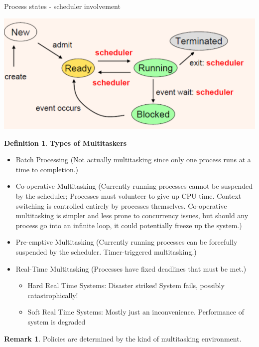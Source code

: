 \documentclass[12pt,a4paper]{article}
\theoremstyle{definition}
\newtheorem*{remark}{Remark}
\newtheorem{definition}{Definition}[section]
\newenvironment{myitemize}
{ \begin{itemize}
    \setlength{\itemsep}{5pt}
    \setlength{\parskip}{0pt}
    \setlength{\parsep}{0pt}     }
{ \end{itemize}                  }
\begin{document}
\begin{tcolorbox}
	\textsf{Process states - scheduler involvement}
	
	\includegraphics[scale=0.4]{m1/processSchedulerStates}
	\centering
\end{tcolorbox}

\begin{definition}{\textbf{Types of Multitaskers}}
	\begin{myitemize}
		\item Batch Processing (Not actually multitasking since only one process runs at a time to completion.)
		\item Co-operative Multitasking (Currently running processes cannot be suspended by the scheduler; Processes must volunteer to give up CPU time. Context switching is controlled entirely by processes themselves. Co-operative multitasking is simpler and less prone to concurrency issues, but should any process go into an infinite loop, it could potentially freeze up the system.)
		\item Pre-emptive Multitasking (Currently running processes can be forcefully suspended by the scheduler. \textsf{Timer-triggered} multitasking.)
		\item Real-Time Multitasking (Processes have fixed deadlines that must be met.)
		\begin{myitemize}
			\item Hard Real Time Systems: Disaster strikes! System fails, possibly catastrophically!
			\item Soft Real Time Systems: Mostly just an inconvenience. Performance of system is degraded
		\end{myitemize}
	\end{myitemize}
\end{definition}
\begin{remark}
	Policies are determined by the kind of multitasking environment.
\end{remark}
\end{document}
